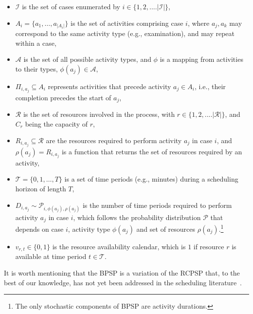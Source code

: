 \begin{itemize}
    \item $\mathcal{I}$ is the set of cases enumerated by $i \in \{1, 2,....|\mathcal{I}|\}$,
    \item $A_i  = \{a_1, \ldots, a_{|A_i|}\}$ is the set of activities comprising case $i$, where $a_j, a_k$ may correspond to the same activity type (e.g., examination),
    and may repeat within a case,
    \item $\mathcal{A}$ is the set of all possible activity types, and $\phi$ is a mapping from activities to their types, $\phi(a_j) \in \mathcal{A}$,
    \item $\Pi_{i,a_j} \subseteq A_i$ represents activities that precede activity $a_j \in A_i$, i.e., their completion precedes the start of $a_j$,
    \item $\mathcal{R}$ is the set of resources involved in the process, with $r \in \{1, 2,....|\mathcal{R}|\}$, and
     $C_r$ being the capacity of $r$,
    \item $R_{i,a_j} \subseteq \mathcal{R}$ are the resources required to perform activity $a_j$ in case $i$, and $\rho(a_j) = R_{i,a_j}$ is a function that returns the set of resources required by an activity,
    \item $\mathcal{T} = \{0, 1, \ldots, T\}$ is a set of time periods (e.g., minutes) during a scheduling horizon of length $T$,
    \item $D_{i,a_j} \sim \mathcal{P}_{i,\phi(a_j), \rho(a_j)}$ is the number of time periods required to perform activity $a_j$ in case $i$, which follows the probability distribution $\mathcal{P}$ that depends on case $i$, activity type $\phi(a_j)$ and set of resources $\rho(a_j)$.\footnote{ The only stochastic components of BPSP are activity durations.}
    \item $v_{r,t} \in \{0,1\}$ is the resource availability calendar, which is $1$ if resource $r$ is available at time period $t \in \mathcal{T}$.
\end{itemize} 
It is worth mentioning that the BPSP is a variation of the RCPSP that, 
to the best of our knowledge, has not yet been addressed in the scheduling literature~\cite{sanchez2023survey}.

